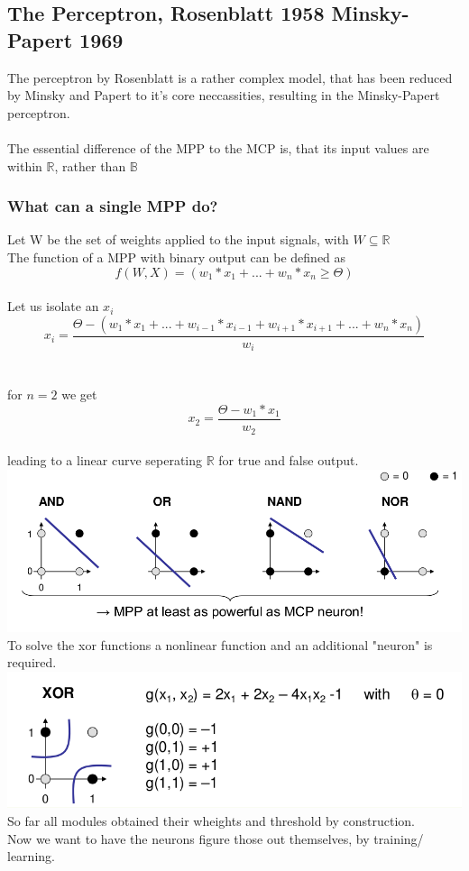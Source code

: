 \documentclass{article}
\begin{document}
\subsection{The Perceptron, Rosenblatt 1958 Minsky-Papert 1969}
The perceptron by Rosenblatt is a rather complex model, that has been reduced by Minsky and Papert to it's core neccassities,
resulting in the Minsky-Papert perceptron.\\
\\
The essential difference of the MPP to the MCP is, that its input values are within $\mathbb{R}$, rather than $\mathbb{B}$\\
\subsubsection{What can a single MPP do?}
Let W be the set of weights applied to the input signals, with $W \subseteq \mathbb{R}$\\
The function of a MPP with binary output can be defined as
$$
f(W, X)  = (w_1*x_1 + ... + w_n*x_n \geq \Theta)
$$
\\
Let us isolate an $x_i$\\
$$
x_i = \frac{ \Theta - (w_1*x_1+ ...+w_{i-1}*x_{i-1}+w_{i+1}*x_{i+1}+... + w_n * x_n)}{w_i}
$$\\
\\
for $n=2$ we get
$$
x_2 = \frac{ \Theta - w_1*x_1}{w_2}
$$\\
leading to a linear curve seperating $\mathbb{R}$ for true and false output.\\
\includegraphics[width=1\textwidth]{MPP.png}
\\
To solve the xor functions a nonlinear function and an additional "neuron" is required.\\
\includegraphics[width=1\textwidth]{XOR.png}
\\
So far all modules obtained their wheights and threshold by construction.\\
Now we want to have the neurons figure those out themselves, by training/ learning.\\
\end{document}
